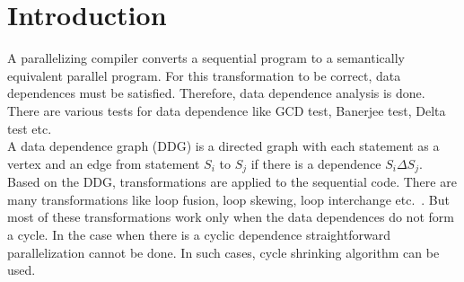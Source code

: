 \chapter{Introduction}


A parallelizing compiler converts a sequential program to a semantically equivalent parallel program. For this transformation to be correct, data dependences must be satisfied. Therefore, data dependence analysis is done. There are various tests for data dependence like GCD test, Banerjee test, Delta test etc.~\cite{allenoptimizing}\\

A data dependence graph (DDG) is a directed graph with each statement as a vertex and an edge from statement $S_i$ to $S_j$ if there is a dependence $S_i \Delta S_j$. \\

Based on the DDG, transformations are applied to the sequential code. There are many transformations like loop fusion, loop skewing, loop interchange etc.~\cite{allenoptimizing}. But most of these transformations work only when the data dependences do not form a cycle. In the case when there is a cyclic dependence straightforward parallelization cannot be done. In such cases, cycle shrinking algorithm can be used.\\

